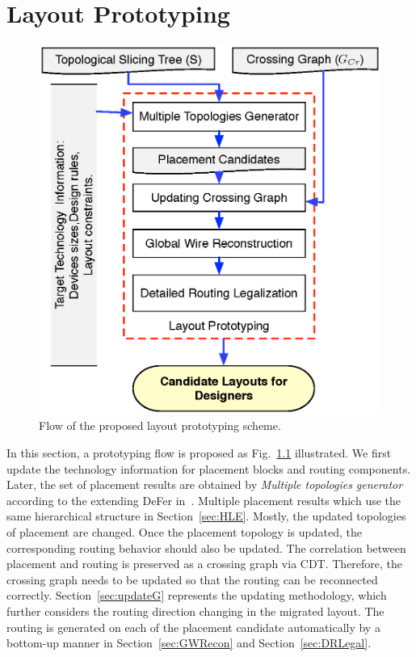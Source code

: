 \chapter{Layout Prototyping}\label{chap:prototyping}

  \begin{figure}[t]
    \centering
    \includegraphics[height=\textwidth]{Fig/proto_flow.eps}
    \caption{Flow of the proposed layout prototyping scheme.} 
    \label{fig:Proto_Flow}
  \end{figure}

  In this section, a prototyping flow is proposed as Fig.~\ref{fig:Proto_Flow} illustrated. We first update the technology information for placement blocks and routing components. Later, the set of placement results are obtained by \textit{Multiple topologies generator} according to the extending DeFer in~\cite{ALP_YPWeng_iccad2011}. Multiple placement results which use the same hierarchical structure in Section~\ref{sec:HLE}. Mostly, the updated topologies of placement are changed. Once the placement topology is updated, the corresponding routing behavior should also be updated. The correlation between placement and routing is preserved as a crossing graph via CDT. Therefore, the crossing graph needs to be updated so that the routing can be reconnected correctly. Section~\ref{sec:updateG} represents the updating methodology, which further considers the routing direction changing in the migrated layout. The routing is generated on each of the placement candidate automatically by a bottom-up manner in Section~\ref{sec:GWRecon} and Section~\ref{sec:DRLegal}. 


